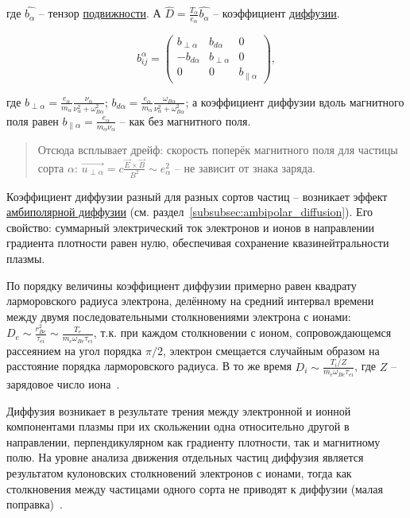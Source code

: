 \documentclass[10pt, a4paper]{article}
\begin{document}
где $\widehat{b_\alpha}$ -- тензор \uline{подвижности}. А $\widehat{D} = \frac{T_\alpha}{e_\alpha}\widehat{b_\alpha}$ -- коэффициент \uline{диффузии}.

\begin{equation*}
	b^\alpha_{ij} = 
	\begin{pmatrix}
		b_{\perp\alpha} & b_{d\alpha} & 0 \\
		-b_{d\alpha} & b_{\perp\alpha} & 0 \\
		0 & 0 & b_{\parallel\alpha}
	\end{pmatrix},
\end{equation*}

где $b_{\perp\alpha} = \frac{e_\alpha}{m_\alpha}\frac{\nu_\alpha}{\nu_\alpha^2+\omega_{B\alpha}^2}$; $b_{d\alpha} = \frac{e_\alpha}{m_\alpha}\frac{\omega_{B\alpha}}{\nu_\alpha^2+\omega_{B\alpha}^2}$; а коэффициент диффузии вдоль магнитного поля равен $b_{\parallel\alpha} = \frac{e_\alpha}{m_\alpha\nu_\alpha}$ -- как без магнитного поля.

\begin{quotation}
	Отсюда всплывает дрейф: скорость поперёк магнитного поля для частицы сорта $\alpha$: $\overrightarrow{u_{\perp\alpha}} = c\frac{\vec{E}\times\vec{B}}{B^2}\sim e_\alpha^2$ -- не зависит от знака заряда.
\end{quotation}

Коэффициент диффузии разный для разных сортов частиц -- возникает эффект \uline{амбиполярной диффузии} (см. раздел~\ref{subsubsec:ambipolar_diffusion}). Его свойство: суммарный электрический ток электронов и ионов в направлении градиента плотности 
равен нулю, обеспечивая сохранение квазинейтральности плазмы.

По порядку величины коэффициент диффузии примерно равен квадрату ларморовского радиуса электрона, делённому на средний интервал времени между двумя последовательными столкновениями электрона с ионами: $D_e\sim\frac{r_{Be}^2}{\tau_{ei}}\sim\frac{T_e}{m_e\omega_{Be}\tau_{ei}}$, т.к. при каждом столкновении с ионом, сопровождающемся рассеянием на угол порядка $\pi/2$, электрон смещается случайным образом на расстояние порядка ларморовского радиуса. В то же время $D_i\sim\frac{T_i/Z}{m_e\omega_{Be}\tau_{ei}}$, где $Z$ -- зарядовое число иона~\cite{kotelnikov}.

Диффузия возникает в результате трения между электронной и ионной компонентами плазмы при их скольжении одна относительно другой в направлении, перпендикулярном как градиенту плотности, так и магнитному полю. На уровне анализа движения отдельных частиц диффузия является результатом кулоновских столкновений электронов с ионами, тогда 	как столкновения между частицами одного сорта не приводят к диффузии (малая поправка)~\cite{kotelnikov}.
\end{document}
